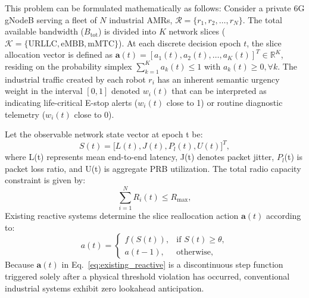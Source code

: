 \documentclass[twocolumn,10pt,twoside]{article}
\begin{document}
This problem can be formulated mathematically as follows: Consider a private 6G gNodeB serving a fleet of $N$ industrial AMRs, $\mathcal{R} = \{r_1, r_2, \dots, r_N\}$. The total available bandwidth ($B_{\text{tot}}$) is divided into $K$ network slices ($\mathcal{K} = \{\text{URLLC}, \text{eMBB}, \text{mMTC}\}$). At each discrete decision epoch $t$, the slice allocation vector is defined as $\mathbf{a}(t) = [a_1(t), a_2(t), \dots, a_K(t)]^T \in \mathbb{R}^K$, residing on the probability simplex $\sum_{k=1}^K a_k(t) \le 1$ with $a_k(t) \ge 0, \forall k$. The industrial traffic created by each robot $r_i$ has an inherent semantic urgency weight in the interval $[0, 1]$ denoted $w_i(t)$ that can be interpreted as indicating life-critical E-stop alerts ($w_i(t)$ close to 1) or routine diagnostic telemetry ($w_i(t)$ close to 0).

Let the observable network state vector at epoch t be:
\begin{equation}
S(t) = \big[ L(t), J(t), P_l(t), U(t) \big]^T,
\label{eq:state_vector}
\end{equation}
where L(t) represents mean end-to-end latency, J(t) denotes packet jitter, $P_l$(t) is packet loss ratio, and U(t) is aggregate PRB utilization. The total radio capacity constraint is given by:
\begin{equation}
\sum_{i=1}^N R_i(t) \le R_{\max},
\label{eq:capacity_constraint}
\end{equation}
Existing reactive systems determine the slice reallocation action $\mathbf{a}(t)$ according to:
\begin{equation}
a(t) = 
\begin{cases}
f(S(t)), & \text{if } S(t) \ge \theta, \\
a(t-1), & \text{otherwise},
\end{cases}
\label{eq:existing_reactive}
\end{equation}
Because $\mathbf{a}(t)$ in Eq.~\eqref{eq:existing_reactive} is a discontinuous step function triggered solely after a physical threshold violation has occurred, conventional industrial systems exhibit zero lookahead anticipation.
\end{document}
